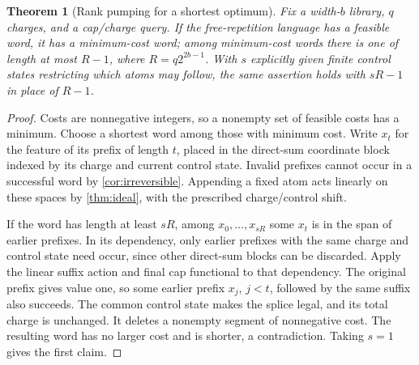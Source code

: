 \documentclass[11pt,a4paper]{article}
\newtheorem{theorem}{Theorem}[section]
\theoremstyle{definition}
\begin{document}
\begin{theorem}[Rank pumping for a shortest optimum]\label{thm:pumping}
Fix a width-$b$ library, $q$ charges, and a cap/charge query. If the free-repetition language has a feasible word, it has a minimum-cost word; among minimum-cost words there is one of length at most $R-1$, where $R=q2^{2b-1}$. With $s$ explicitly given finite control states restricting which atoms may follow, the same assertion holds with $sR-1$ in place of $R-1$.
\end{theorem}
\begin{proof}
Costs are nonnegative integers, so a nonempty set of feasible costs has a minimum. Choose a shortest word among those with minimum cost. Write $x_t$ for the feature of its prefix of length $t$, placed in the direct-sum coordinate block indexed by its charge and current control state. Invalid prefixes cannot occur in a successful word by \cref{cor:irreversible}. Appending a fixed atom acts linearly on these spaces by \cref{thm:ideal}, with the prescribed charge/control shift.

If the word has length at least $sR$, among $x_0,\ldots,x_{sR}$ some $x_t$ is in the span of earlier prefixes. In its dependency, only earlier prefixes with the same charge and control state need occur, since other direct-sum blocks can be discarded. Apply the linear suffix action and final cap functional to that dependency. The original prefix gives value one, so some earlier prefix $x_j$, $j<t$, followed by the same suffix also succeeds. The common control state makes the splice legal, and its total charge is unchanged. It deletes a nonempty segment of nonnegative cost. The resulting word has no larger cost and is shorter, a contradiction. Taking $s=1$ gives the first claim.
\end{proof}
\end{document}
